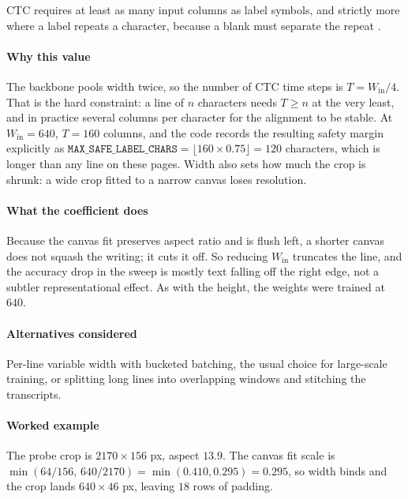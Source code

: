 CTC requires at least as many input columns as label symbols, and strictly more where a label repeats a character, because a blank must separate the repeat \cite[pp.~370--372]{graves2006}.

\paragraph{Why this value}

The backbone pools width twice, so the number of CTC time steps is $T = W_{\text{in}}/4$. That is the hard constraint: a line of $n$ characters needs $T \ge n$ at the very least, and in practice several columns per character for the alignment to be stable. At $W_{\text{in}} = 640$, $T = 160$ columns, and the code records the resulting safety margin explicitly as $\texttt{MAX\_SAFE\_LABEL\_CHARS} = \lfloor 160 \times 0.75 \rfloor = 120$ characters, which is longer than any line on these pages. Width also sets how much the crop is shrunk: a wide crop fitted to a narrow canvas loses resolution.

\paragraph{What the coefficient does}

Because the canvas fit preserves aspect ratio and is flush left, a shorter canvas does not squash the writing; it cuts it off. So reducing $W_{\text{in}}$ truncates the line, and the accuracy drop in the sweep is mostly text falling off the right edge, not a subtler representational effect. As with the height, the weights were trained at $640$.

\paragraph{Alternatives considered}

Per-line variable width with bucketed batching, the usual choice for large-scale training, or splitting long lines into overlapping windows and stitching the transcripts.

\paragraph{Worked example}

The probe crop is $2170 \times 156$ px, aspect $13.9$. The canvas fit scale is $\min(64/156,\,640/2170) = \min(0.410,0.295) = 0.295$, so width binds and the crop lands $640 \times 46$ px, leaving $18$ rows of padding.

